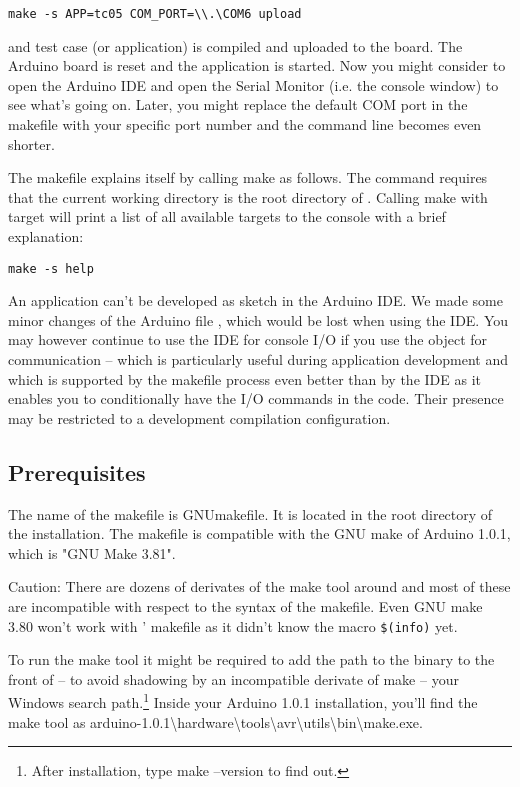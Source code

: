 \verb+make -s APP=tc05 COM_PORT=\\.\COM6 upload+

and test case (or application)  is compiled and uploaded
to the board. The Arduino board is reset and the \rtos{} application is
started. Now you might consider to open the Arduino IDE and open the
Serial Monitor (i.e. the console window) to see what's going on. Later,
you might replace the default COM port in the makefile with your specific
port number and the command line becomes even shorter.

The makefile explains itself by calling make as follows. The command
requires that the current working directory is the root directory of
\rtos{}. Calling make with target  will print a list of all
available targets to the console with a brief explanation:

\verb+make -s help+

An \rtos{} application can't be developed as sketch in the Arduino IDE. We
made some minor changes of the Arduino file , which would be
lost when using the IDE. You may however continue to use the IDE for
console I/O if you use the object  for communication --
which is particularly useful during application development and which is
supported by the makefile process even better than by the IDE as it
enables you to conditionally have the I/O commands in the code. Their
presence may be restricted to a development compilation configuration.


\subsection{Prerequisites}

The name of the makefile is GNUmakefile. It is located in the root
directory of the \rtos{} installation. The makefile is compatible with the
GNU make of Arduino 1.0.1, which is "GNU Make 3.81".

Caution: There are dozens of derivates of the make tool around and most
of these are incompatible with respect to the syntax of the makefile. Even
GNU make 3.80 won't work with \rtos' makefile as it didn't know the
macro \verb+$(info)+ yet.

To run the make tool it might be required to add the path to the binary to
the front of -- to avoid shadowing by an incompatible derivate of make --
your Windows search path.\footnote{After installation, type make --version
to find out.} Inside your Arduino 1.0.1 installation, you'll find the make
tool as
arduino-1.0.1\textbackslash\-hard\-ware\textbackslash\-tools\textbackslash\-avr\textbackslash\-utils\textbackslash\-bin\textbackslash\-make.exe.


